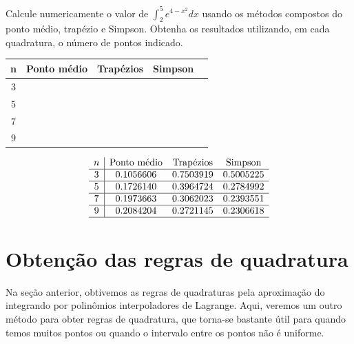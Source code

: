 \begin{exer}
Calcule numericamente o valor de $\int_2^5e^{4-x^2}dx$ usando os métodos compostos do ponto médio, trapézio e Simpson. Obtenha os resultados utilizando, em cada quadratura, o número de pontos indicado.
\begin{center}
\begin{tabular}{|c|c|c|c|c|}
\hline
n   & Ponto médio & Trapézios & Simpson \\
\hline
$3$ &~\hspace{40pt}~& ~\hspace{40pt}~& ~\hspace{40pt}\\
\hline
$5 $ & & & \\
\hline
$7 $ & & &\\
\hline
$9$  & & &\\
\hline
\end{tabular}
\end{center}
\end{exer}
\begin{resp}
  
    \begin{equation*}
    \begin{array}{c|cccc}
        n   & \text{Ponto médio} & \text{Trapézios} & \text{Simpson} \\  \hline
        3 & 0.1056606  &  0.7503919  &  0.5005225  \\  \hline
        5 & 0.1726140 &   0.3964724  &  0.2784992   \\\hline
        7 & 0.1973663 &   0.3062023  &  0.2393551  \\ \hline
        9  &  0.2084204 &   0.2721145  &  0.2306618  \\ \hline
    \end{array}      
    \end{equation*}
  
\end{resp}



\section{Obtenção das regras de quadratura}

Na seção anterior, obtivemos as regras de quadraturas pela aproximação do integrando por polinômios interpoladores de Lagrange. Aqui, veremos um outro método para obter regras de quadratura, que torna-se bastante útil para quando temos muitos pontos ou quando o intervalo entre os pontos não é uniforme.

